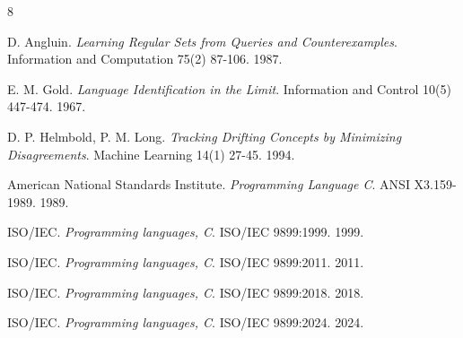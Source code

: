 \backmatter
{}
\begin{thebibliography}{8}

D. Angluin. \emph{Learning Regular Sets from Queries and Counterexamples}. Information and Computation 75(2) 87-106. 1987.

E. M. Gold. \emph{Language Identification in the Limit}. Information and Control 10(5) 447-474. 1967.

D. P. Helmbold, P. M. Long. \emph{Tracking Drifting Concepts by Minimizing Disagreements}. Machine Learning 14(1) 27-45. 1994.

American National Standards Institute. \emph{Programming Language C}. ANSI X3.159-1989. 1989.

ISO/IEC. \emph{Programming languages, C}. ISO/IEC 9899:1999. 1999.

ISO/IEC. \emph{Programming languages, C}. ISO/IEC 9899:2011. 2011.

ISO/IEC. \emph{Programming languages, C}. ISO/IEC 9899:2018. 2018.

ISO/IEC. \emph{Programming languages, C}. ISO/IEC 9899:2024. 2024.

\end{thebibliography}
